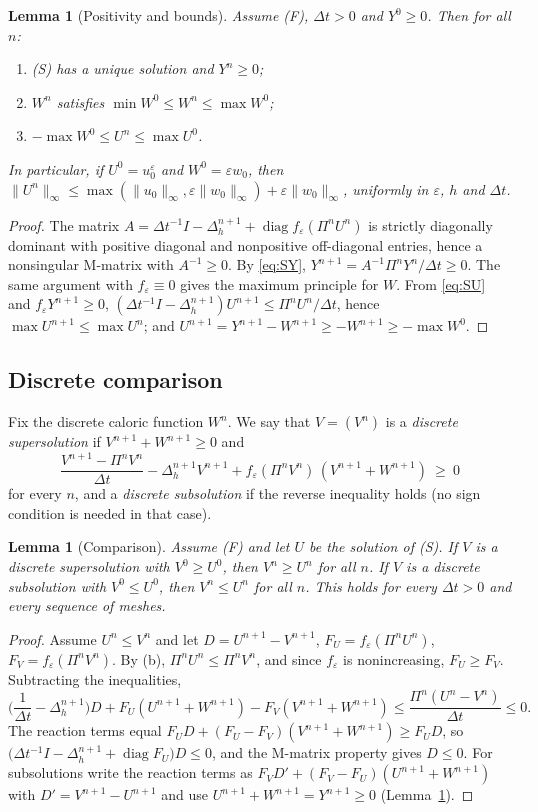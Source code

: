 \documentclass[11pt]{amsart}
\newtheorem{lemma}[theorem]{Lemma}
\theoremstyle{remark}
\newcommand{\ve}{\varepsilon}
\begin{document}
\begin{lemma}[Positivity and bounds]\label{lem:bounds}
Assume (F), $\Delta t>0$ and $Y^0\ge0$. Then for all $n$:
\begin{enumerate}
\item (S) has a unique solution and $Y^n\ge0$;
\item $W^n$ satisfies $\min W^0\le W^n\le\max W^0$;
\item $-\max W^0\le U^n\le\max U^0$.
\end{enumerate}
In particular, if $U^0=u^\ve_0$ and $W^0=\ve w_0$, then
$\|U^n\|_\infty\le\max(\|u_0\|_\infty,\ve\|w_0\|_\infty)+\ve\|w_0\|_\infty$,
uniformly in $\ve$, $h$ and $\Delta t$.
\end{lemma}

\begin{proof}
The matrix $A=\Delta t^{-1}I-\Delta_h^{n+1}+\operatorname{diag}f_\ve(\Pi^nU^n)$
is strictly diagonally dominant with positive diagonal and nonpositive
off-diagonal entries, hence a nonsingular M-matrix with $A^{-1}\ge0$. By
\eqref{eq:SY}, $Y^{n+1}=A^{-1}\Pi^nY^n/\Delta t\ge0$. The same argument with
$f_\ve\equiv0$ gives the maximum principle for $W$. From \eqref{eq:SU} and
$f_\ve Y^{n+1}\ge0$, $(\Delta t^{-1}I-\Delta_h^{n+1})U^{n+1}\le\Pi^nU^n/\Delta t$,
hence $\max U^{n+1}\le\max U^n$; and $U^{n+1}=Y^{n+1}-W^{n+1}\ge-W^{n+1}\ge-\max W^0$.
\end{proof}

\subsection{Discrete comparison}
Fix the discrete caloric function $W^n$. We say that $V=(V^n)$ is a
\emph{discrete supersolution} if $V^{n+1}+W^{n+1}\ge0$ and
\[
\frac{V^{n+1}-\Pi^nV^n}{\Delta t}-\Delta_h^{n+1}V^{n+1}+f_\ve(\Pi^nV^n)\,(V^{n+1}+W^{n+1})\ \ge\ 0
\]
for every $n$, and a \emph{discrete subsolution} if the reverse inequality
holds (no sign condition is needed in that case).

\begin{lemma}[Comparison]\label{lem:comparison}
Assume (F) and let $U$ be the solution of (S). If $V$ is a discrete
supersolution with $V^0\ge U^0$, then $V^n\ge U^n$ for all $n$. If $V$ is a
discrete subsolution with $V^0\le U^0$, then $V^n\le U^n$ for all $n$. This
holds for every $\Delta t>0$ and every sequence of meshes.
\end{lemma}

\begin{proof}
Assume $U^n\le V^n$ and let $D=U^{n+1}-V^{n+1}$, $F_U=f_\ve(\Pi^nU^n)$,
$F_V=f_\ve(\Pi^nV^n)$. By (b), $\Pi^nU^n\le\Pi^nV^n$, and since $f_\ve$ is
nonincreasing, $F_U\ge F_V$. Subtracting the inequalities,
\[
\Big(\frac1{\Delta t}-\Delta_h^{n+1}\Big)D+F_U(U^{n+1}+W^{n+1})-F_V(V^{n+1}+W^{n+1})
\le\frac{\Pi^n(U^n-V^n)}{\Delta t}\le0 .
\]
The reaction terms equal $F_UD+(F_U-F_V)(V^{n+1}+W^{n+1})\ge F_UD$, so
$\big(\Delta t^{-1}I-\Delta_h^{n+1}+\operatorname{diag}F_U\big)D\le0$, and the
M-matrix property gives $D\le0$. For subsolutions write the reaction terms as
$F_VD'+(F_V-F_U)(U^{n+1}+W^{n+1})$ with $D'=V^{n+1}-U^{n+1}$ and use
$U^{n+1}+W^{n+1}=Y^{n+1}\ge0$ (Lemma~\ref{lem:bounds}).
\end{proof}
\end{document}
